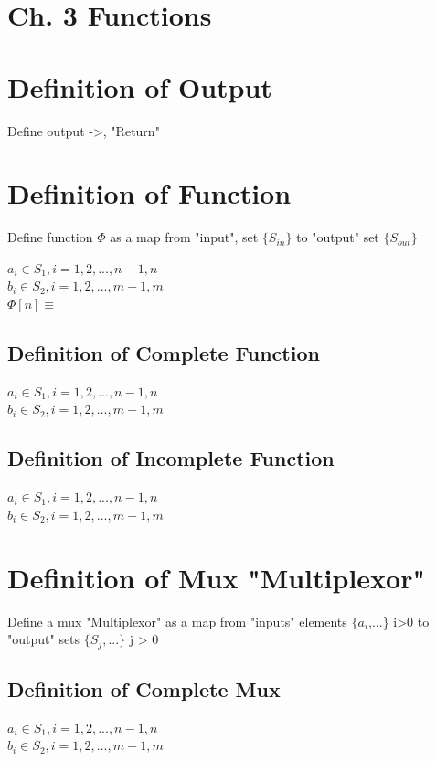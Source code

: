 \documentclass[11pt]{article}
\begin{document}
\section*{Ch. 3 Functions}

\section{Definition of Output}
Define output ->, "Return"

\section{Definition of Function}
Define function $\Phi$ as a map from "input", set $\{S_{in}\}$ to "output" set $\{S_{out}\}$
\begin{center}
$a_i \in  S_1,  i=1,2,...,n-1,n$\\
$b_i \in  S_2,  i=1,2,...,m-1,m$\\
$\Phi[n] \equiv $
\end{center}

\subsection{Definition of Complete Function}
\begin{center}
$a_i \in  S_1,  i=1,2,...,n-1,n$\\
$b_i \in  S_2,  i=1,2,...,m-1,m$\\
\end{center}


\subsection{Definition of Incomplete Function}
\begin{center}
$a_i \in  S_1,  i=1,2,...,n-1,n$\\
$b_i \in  S_2,  i=1,2,...,m-1,m$\\
\end{center}






\section{Definition of Mux "Multiplexor"}
Define a mux "Multiplexor" as a map from "inputs" elements $\{a_{i}$,...\} i>0 to "output" sets $\{S_j,...\}$ j > 0

\subsection{Definition of Complete Mux}
\begin{center}
$a_i \in  S_1,  i=1,2,...,n-1,n$\\
$b_i \in  S_2,  i=1,2,...,m-1,m$\\
\end{center}
\end{document}
